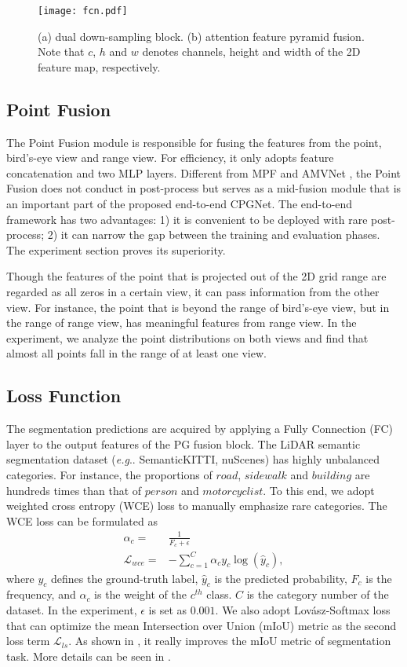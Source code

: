\documentclass[letterpaper, 10 pt, conference]{ieeeconf}
\makeatletter
\DeclareRobustCommand\onedot{\futurelet\@let@token\@onedot}
\def\@onedot{\ifx\@let@token.\else.\null\fi\xspace}
\def\eg{\emph{e.g}\onedot} \def\Eg{\emph{E.g}\onedot}
\makeatother
\begin{document}
\begin{figure}[t]
\centering
\texttt{[image: fcn.pdf]}
\caption{(a) dual down-sampling block. (b) attention feature pyramid fusion. Note that $c$, $h$ and $w$ denotes channels, height and width of the 2D feature map, respectively.}
\label{Fig_fcn}
\end{figure}

\subsection{Point Fusion}
The Point Fusion module is responsible for fusing the features from the point, bird’s-eye view and range view. For efficiency, it only adopts feature concatenation and two MLP layers. Different from MPF \cite{alnaggar2021multi} and AMVNet \cite{liong2020amvnet}, the Point Fusion does not conduct in post-process but serves as a mid-fusion module that is an important part of the proposed end-to-end CPGNet. The end-to-end framework has two advantages: 1) it is convenient to be deployed with rare post-process; 2) it can narrow the gap between the training and evaluation phases. The experiment section proves its superiority.

Though the features of the point that is projected out of the 2D grid range are regarded as all zeros in a certain view, it can pass information from the other view. For instance, the point that is beyond the range of bird’s-eye view, but in the range of range view, has meaningful features from range view. In the experiment, we analyze the point distributions on both views and find that almost all points fall in the range of at least one view.

\subsection{Loss Function}
The segmentation predictions are acquired by applying a Fully Connection (FC) layer to the output features of the PG fusion block. The LiDAR semantic segmentation dataset (\eg SemanticKITTI, nuScenes) has highly unbalanced categories. For instance, the proportions of $road$, $sidewalk$ and $building$ are hundreds times than that of $person$ and $motorcyclist$. To this end, we adopt weighted cross entropy (WCE) loss to manually emphasize rare categories. The WCE loss can be formulated as
\begin{align}
\alpha_c =& \frac{1}{F_c+\epsilon} \nonumber \\
\mathcal{L}_{wce} =& -\sum_{c=1}^{C}\alpha_c y_c \log(\hat{y}_c),
\end{align}
where $y_c$ defines the ground-truth label, $\hat{y}_c$ is the predicted probability, $F_c$ is the frequency, and $\alpha_c$ is the weight of the $c^{th}$ class. $C$ is the category number of the dataset. In the experiment, $\epsilon$ is set as $0.001$. We also adopt Lov{\'a}sz-Softmax loss \cite{berman2018lovasz} that can optimize the mean Intersection over Union (mIoU) metric as the second loss term $\mathcal{L}_{ls}$. As shown in \cite{aksoy2020salsanet, razani2021lite}, it really improves the mIoU metric of segmentation task. More details can be seen in \cite{berman2018lovasz}.
\end{document}
